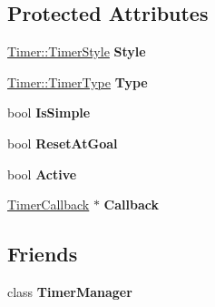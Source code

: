 \subsection*{Protected Attributes}
\begin{DoxyCompactItemize}
\item 
\hypertarget{classphys_1_1Timer_a4b0ece69e1df2bd7dd3c8001c279276a}{
\hyperlink{classphys_1_1Timer_a1ee86bf43e20329d750c5d582dcce329}{Timer::TimerStyle} {\bfseries Style}}
\label{d3/d83/classphys_1_1Timer_a4b0ece69e1df2bd7dd3c8001c279276a}

\item 
\hypertarget{classphys_1_1Timer_ac22ea3e7dfa49b2653d03b9579a04972}{
\hyperlink{classphys_1_1Timer_aacbbca9cc5543fc8414de59cd085c1c1}{Timer::TimerType} {\bfseries Type}}
\label{d3/d83/classphys_1_1Timer_ac22ea3e7dfa49b2653d03b9579a04972}

\item 
\hypertarget{classphys_1_1Timer_a3b2206e862a28209d72975d2c880aabd}{
bool {\bfseries IsSimple}}
\label{d3/d83/classphys_1_1Timer_a3b2206e862a28209d72975d2c880aabd}

\item 
\hypertarget{classphys_1_1Timer_a5a3508f2d43623da08ed2944e26063fd}{
bool {\bfseries ResetAtGoal}}
\label{d3/d83/classphys_1_1Timer_a5a3508f2d43623da08ed2944e26063fd}

\item 
\hypertarget{classphys_1_1Timer_a7336fd0658dfd6688bdd1d885b65c4b4}{
bool {\bfseries Active}}
\label{d3/d83/classphys_1_1Timer_a7336fd0658dfd6688bdd1d885b65c4b4}

\item 
\hypertarget{classphys_1_1Timer_aaaf41b293cd70432d1d3224fc4f6aaae}{
\hyperlink{classphys_1_1TimerCallback}{TimerCallback} $\ast$ {\bfseries Callback}}
\label{d3/d83/classphys_1_1Timer_aaaf41b293cd70432d1d3224fc4f6aaae}

\end{DoxyCompactItemize}
\subsection*{Friends}
\begin{DoxyCompactItemize}
\item 
\hypertarget{classphys_1_1Timer_a8f762e12639d620eb0f10068e6ab6521}{
class {\bfseries TimerManager}}
\label{d3/d83/classphys_1_1Timer_a8f762e12639d620eb0f10068e6ab6521}

\end{DoxyCompactItemize}


